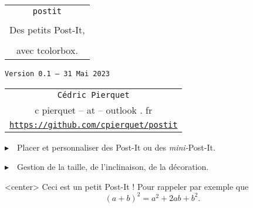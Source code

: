 \documentclass[french,a4paper,11pt]{article}
\def\TPversion{0.1}
\def\TPdate{31 Mai 2023}
\begin{document}
\setlength{\aweboxleftmargin}{0.07\linewidth}
\setlength{\aweboxcontentwidth}{0.93\linewidth}
\setlength{\aweboxvskip}{8pt}

\pagestyle{fancy}

\thispagestyle{empty}

\vspace{2cm}

\begin{center}
	\begin{minipage}{0.75\linewidth}
	\begin{tcolorbox}[colframe=yellow,colback=yellow!15]
		\begin{center}
			\begin{tabular}{c}
				{\Huge \texttt{postit}}\\
				\\
				{\LARGE Des petits Post-It,} \\
				\\
				{\LARGE avec \textsf{tcolorbox}.} \\
			\end{tabular}
			
			\bigskip
			
			{\small \texttt{Version \TPversion{} -- \TPdate}}
		\end{center}
	\end{tcolorbox}
\end{minipage}
\end{center}

\begin{center}
	\begin{tabular}{c}
	\texttt{Cédric Pierquet}\\
	{\ttfamily c pierquet -- at -- outlook . fr}\\
	\texttt{\url{https://github.com/cpierquet/postit}}
\end{tabular}
\end{center}

\vspace{0.25cm}

{$\blacktriangleright$~~Placer et personnaliser des Post-It ou des \textit{mini-}Post-It.}

\vspace{0.25cm}

{$\blacktriangleright$~~Gestion de la taille, de l'inclinaison, de la décoration.}

\vspace{1cm}

\begin{PostIt}<center>
	Ceci est un petit Post-It ! Pour rappeler par exemple que \[(a+b)^2=a^2+2ab+b^2.\]
\end{PostIt}
\end{document}
